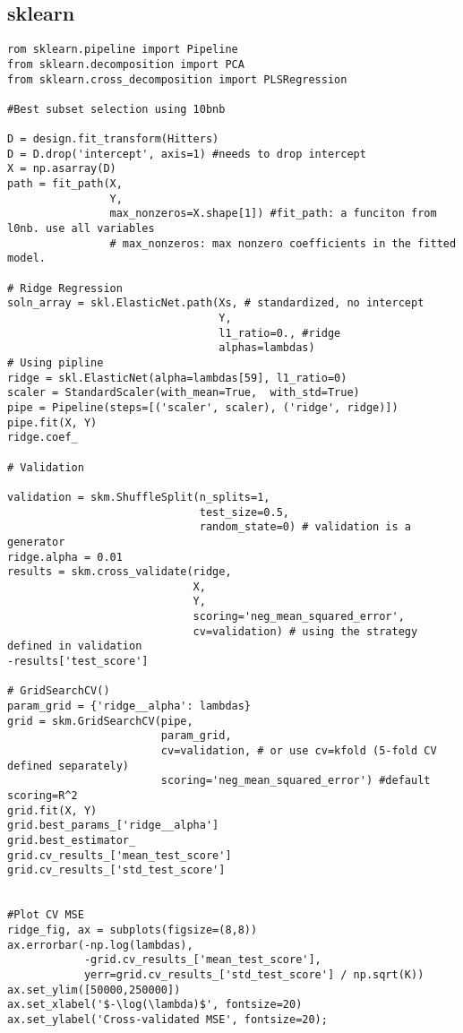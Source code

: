 \documentclass[
  letterpaper,
  DIV=11,
  numbers=noendperiod]{scrreprt}
\begin{document}
\subsection{sklearn}\label{sklearn-2}

\begin{verbatim}
rom sklearn.pipeline import Pipeline
from sklearn.decomposition import PCA
from sklearn.cross_decomposition import PLSRegression

#Best subset selection using 10bnb

D = design.fit_transform(Hitters)
D = D.drop('intercept', axis=1) #needs to drop intercept
X = np.asarray(D)
path = fit_path(X, 
                Y,
                max_nonzeros=X.shape[1]) #fit_path: a funciton from l0nb. use all variables
                # max_nonzeros: max nonzero coefficients in the fitted model.

# Ridge Regression
soln_array = skl.ElasticNet.path(Xs, # standardized, no intercept
                                 Y,
                                 l1_ratio=0., #ridge
                                 alphas=lambdas)
# Using pipline
ridge = skl.ElasticNet(alpha=lambdas[59], l1_ratio=0)
scaler = StandardScaler(with_mean=True,  with_std=True)
pipe = Pipeline(steps=[('scaler', scaler), ('ridge', ridge)])
pipe.fit(X, Y)
ridge.coef_

# Validation

validation = skm.ShuffleSplit(n_splits=1,
                              test_size=0.5,
                              random_state=0) # validation is a generator
ridge.alpha = 0.01
results = skm.cross_validate(ridge,
                             X,
                             Y,
                             scoring='neg_mean_squared_error',
                             cv=validation) # using the strategy defined in validation
-results['test_score']

# GridSearchCV()
param_grid = {'ridge__alpha': lambdas}
grid = skm.GridSearchCV(pipe,
                        param_grid,
                        cv=validation, # or use cv=kfold (5-fold CV defined separately)
                        scoring='neg_mean_squared_error') #default scoring=R^2
grid.fit(X, Y)
grid.best_params_['ridge__alpha']
grid.best_estimator_
grid.cv_results_['mean_test_score']
grid.cv_results_['std_test_score']


#Plot CV MSE
ridge_fig, ax = subplots(figsize=(8,8))
ax.errorbar(-np.log(lambdas),
            -grid.cv_results_['mean_test_score'],
            yerr=grid.cv_results_['std_test_score'] / np.sqrt(K))
ax.set_ylim([50000,250000])
ax.set_xlabel('$-\log(\lambda)$', fontsize=20)
ax.set_ylabel('Cross-validated MSE', fontsize=20);


\end{verbatim}
\end{document}

